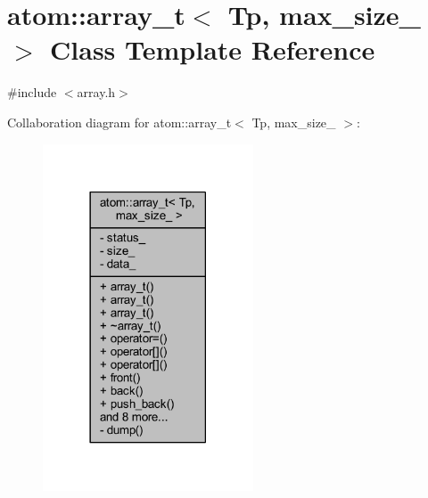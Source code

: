 \hypertarget{classatom_1_1array__t}{}\section{atom\+:\+:array\+\_\+t$<$ Tp, max\+\_\+size\+\_\+ $>$ Class Template Reference}
\label{classatom_1_1array__t}


{\ttfamily \#include $<$array.\+h$>$}



Collaboration diagram for atom\+:\+:array\+\_\+t$<$ Tp, max\+\_\+size\+\_\+ $>$\+:
\nopagebreak
\begin{figure}[H]
\begin{center}
\leavevmode
\includegraphics[width=177pt]{classatom_1_1array__t__coll__graph}
\end{center}
\end{figure}
